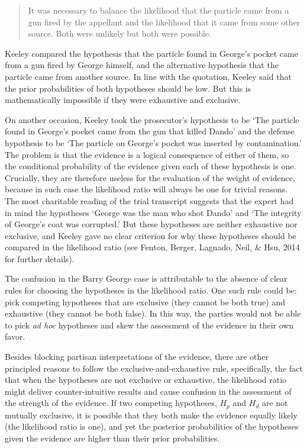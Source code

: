 \documentclass[
  10pt,
  dvipsnames,enabledeprecatedfontcommands]{scrartcl}
\begin{document}
\begin{quote}
    It was necessary to balance the likelihood that the particle came from a gun fired by the appellant and the likelihood that it came from some other source. Both were unlikely but both were possible.
\end{quote}

\noindent  Keeley compared the hypothesis that the particle found in
George's pocket came from a gun fired by George himself, and the
alternative hypothesis that the particle came from another source. In
line with the quotation, Keeley said that the prior probabilities of
both hypotheses should be low. But this is mathematically impossible if
they were exhaustive and exclusive.

On another occasion, Keeley took the prosecutor's hypothesis to be `The
particle found in George's pocket came from the gun that killed Dando'
and the defense hypothesis to be `The particle on George's pocket was
inserted by contamination.' The problem is that the evidence is a
logical consequence of either of them, so the conditional probability of
the evidence given each of these hypothesis is one. Crucially, they are
therefore useless for the evaluation of the weight of evidence, because
in such case the likelihood ratio will always be one for trivial
reasons. The most charitable reading of the trial transcript suggests
that the expert had in mind the hypotheses `George was the man who shot
Dando' and `The integrity of George's coat was corrupted.' But these
hypotheses are neither exhaustive nor exclusive, and Keeley gave no
clear criterion for why these hypotheses should be compared in the
likelihood ratio (see Fenton, Berger, Lagnado, Neil, \& Hsu, 2014 for
further details).

The confusion in the Barry George case is attributable to the absence of
clear rules for choosing the hypotheses in the likelihood ratio. One
such rule could be: pick competing hypotheses that are exclusive (they
cannot be both true) and exhaustive (they cannot be both false). In this
way, the parties would not be able to pick \textit{ad hoc} hypotheses
and skew the assessment of the evidence in their own favor.

Besides blocking partisan interpretations of the evidence, there are
other principled reasons to follow the exclusive-and-exhaustive rule,
specifically, the fact that when the hypotheses are not exclusive or
exhaustive, the likelihood ratio might deliver counter-intuitive results
and cause confusion in the assessment of the strength of the evidence.
If two competing hypotheses, \(H_p\) and \(H_d\) are not mutually
exclusive, it is possible that they both make the evidence equally
likely (the likelihood ratio is one), and yet the posterior
probabilities of the hypotheses given the evidence are higher than their
prior probabilities.
\end{document}
